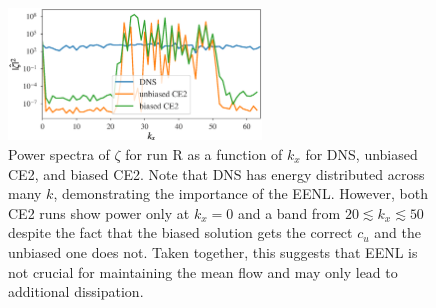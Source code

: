 \documentclass{jfm}
\newcommand{\cu}{c_u}
\begin{document}
\begin{figure}
  \centering
  \includegraphics[width=0.6\textwidth]{fig4.eps}
  \caption{Power spectra of $\zeta$ for run R as a function of $k_x$ for DNS, unbiased CE2, and biased CE2. Note that DNS has energy distributed across many $k$, demonstrating the importance of the EENL. However, both CE2 runs show power only at $k_x = 0$ and a band from $20 \lesssim k_x \lesssim 50$ despite the fact that the biased solution gets the correct $\cu$ and the unbiased one does not. Taken together, this suggests that EENL is not crucial for maintaining the mean flow and may only lead to additional dissipation.}
  \label{fig:power_spec_S}
\end{figure}
\end{document}
